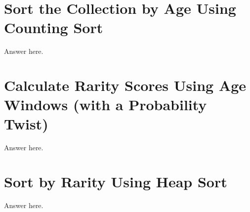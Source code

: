 \label{implementation}

\section{Sort the Collection by Age Using Counting Sort}

Answer here.

\section{Calculate Rarity Scores Using Age Windows (with a Probability Twist)}

Answer here.

\section{Sort by Rarity Using Heap Sort}

Answer here.
